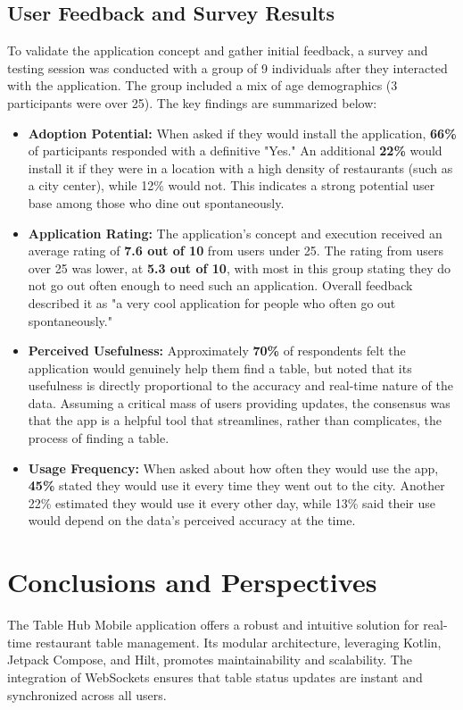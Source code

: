 \documentclass{article}
\begin{document}
\subsection{User Feedback and Survey Results}
To validate the application concept and gather initial feedback, a survey and testing session was conducted with a group of 9 individuals after they interacted with the application. The group included a mix of age demographics (3 participants were over 25). The key findings are summarized below:

\begin{itemize}
    \item \textbf{Adoption Potential:} When asked if they would install the application, \textbf{66\%} of participants responded with a definitive "Yes." An additional \textbf{22\%} would install it if they were in a location with a high density of restaurants (such as a city center), while 12\% would not. This indicates a strong potential user base among those who dine out spontaneously.

    \item \textbf{Application Rating:} The application's concept and execution received an average rating of \textbf{7.6 out of 10} from users under 25. The rating from users over 25 was lower, at \textbf{5.3 out of 10}, with most in this group stating they do not go out often enough to need such an application. Overall feedback described it as "a very cool application for people who often go out spontaneously."

    \item \textbf{Perceived Usefulness:} Approximately \textbf{70\%} of respondents felt the application would genuinely help them find a table, but noted that its usefulness is directly proportional to the accuracy and real-time nature of the data. Assuming a critical mass of users providing updates, the consensus was that the app is a helpful tool that streamlines, rather than complicates, the process of finding a table.

    \item \textbf{Usage Frequency:} When asked about how often they would use the app, \textbf{45\%} stated they would use it every time they went out to the city. Another 22\% estimated they would use it every other day, while 13\% said their use would depend on the data's perceived accuracy at the time.
\end{itemize}

\section{Conclusions and Perspectives}
The Table Hub Mobile application offers a robust and intuitive solution for real-time restaurant table management. Its modular architecture, leveraging Kotlin, Jetpack Compose, and Hilt, promotes maintainability and scalability. The integration of WebSockets ensures that table status updates are instant and synchronized across all users.
\end{document}
